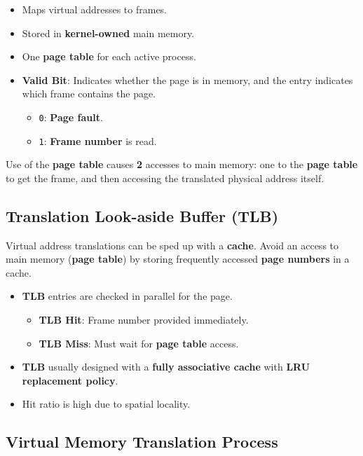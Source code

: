 \documentclass[12pt, letterpaper]{article}
\begin{document}
\begin{itemize}
  \item Maps virtual addresses to frames.
  \item Stored in \textbf{kernel-owned} main memory.
  \item One \textbf{page table} for each active process.
  \item \textbf{Valid Bit}: Indicates whether the page is in memory,
    and the entry indicates which frame contains the page.
    \begin{itemize}
      \item \texttt{0}: \textbf{Page fault}.
      \item \texttt{1}: \textbf{Frame number} is read.
    \end{itemize}
\end{itemize}

Use of the \textbf{page table} causes \textbf{2} accesses to main
memory: one to the \textbf{page table} to get the frame, and then
accessing the translated physical address itself.

\subsection*{Translation Look-aside Buffer (TLB)}

Virtual address translations can be sped up with a \textbf{cache}.
Avoid an access to main memory (\textbf{page table}) by storing
frequently accessed \textbf{page numbers} in a cache.

\begin{itemize}
  \item \textbf{TLB} entries are checked in parallel for the page.
    \begin{itemize}
      \item \textbf{TLB Hit}: Frame number provided immediately.
      \item \textbf{TLB Miss}: Must wait for \textbf{page table} access.
    \end{itemize}
  \item \textbf{TLB} usually designed with a \textbf{fully
    associative cache} with \textbf{LRU replacement policy}.
  \item Hit ratio is high due to spatial locality.
\end{itemize}

\subsection*{Virtual Memory Translation Process}
\end{document}
